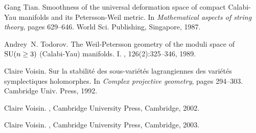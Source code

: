 \documentclass[a4paper,11pt,final]{amsart}
\theoremstyle{plain}
\theoremstyle{definition}
\numberwithin{equation}{section}
\theoremstyle{remark}
\begin{document}
\begin{thebibliography}{BHPVdV04}
Gang Tian.
\newblock Smoothness of the universal deformation space of compact
  {C}alabi-{Y}au manifolds and its {P}etersson-{W}eil metric.
\newblock In {\em Mathematical aspects of string theory}, pages 629--646. World Sci. Publishing, Singapore, 1987.

Andrey~N. Todorov.
\newblock The {W}eil-{P}etersson geometry of the moduli space of {${\rm
  SU}(n\geq 3)$} ({C}alabi-{Y}au) manifolds. {I}.
, 126(2):325--346, 1989.

Claire Voisin.
\newblock Sur la stabilit\'e des sous-vari\'et\'es lagrangiennes des
  vari\'et\'es symplectiques holomorphes.
\newblock In {\em Complex projective geometry}, pages 294--303. Cambridge Univ. Press, 1992.

Claire Voisin.
,
\newblock Cambridge University Press, Cambridge, 2002.

Claire Voisin.
, 
\newblock Cambridge University Press, Cambridge, 2003.

\end{thebibliography}
\end{document}
